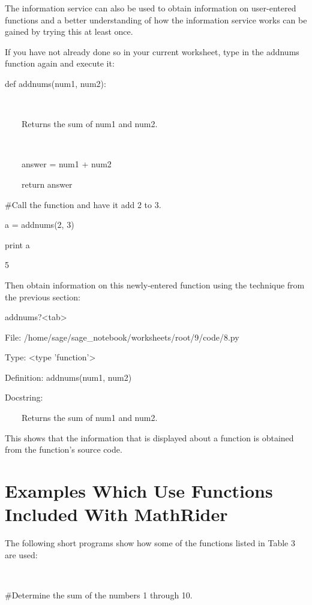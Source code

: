 \documentclass[12pt,oneside]{book}
\begin{document}
The information service can also be used to obtain information on user{}-entered functions and a better understanding of how the information service works can be gained by trying this at least once. 

If you have not already done so in your current worksheet, type in the addnums function again and execute it:  

def addnums(num1, num2):

\ \ \ \ {\textquotedbl}{\textquotedbl}{\textquotedbl}

\ \ \ \ Returns the sum of num1 and num2.

\ \ \ \ {\textquotedbl}{\textquotedbl}{\textquotedbl}

\ \ \ \ answer = num1 + num2

\ \ \ \ return answer


\#Call the function and have it add 2 to 3.

a = addnums(2, 3)

print a

{\textbar}

5


Then obtain information on this newly{}-entered function using the technique from the previous section: 

addnums?{\textless}tab{\textgreater}

{\textbar}

File: /home/sage/sage\_notebook/worksheets/root/9/code/8.py   

Type: {\textless}type 'function'{\textgreater}

Definition: addnums(num1, num2)        

Docstring:            

              

\ \ \ \ Returns the sum of num1 and num2.       


This shows that the information that is displayed about a function is obtained from the function's source code.

\section[Examples Which Use Functions Included With MathRider]{ Examples Which Use Functions Included With MathRider}

The following short programs show how some of the functions listed in Table 3 are used:

\ 

\#Determine the sum of the numbers 1 through 10.
\end{document}
